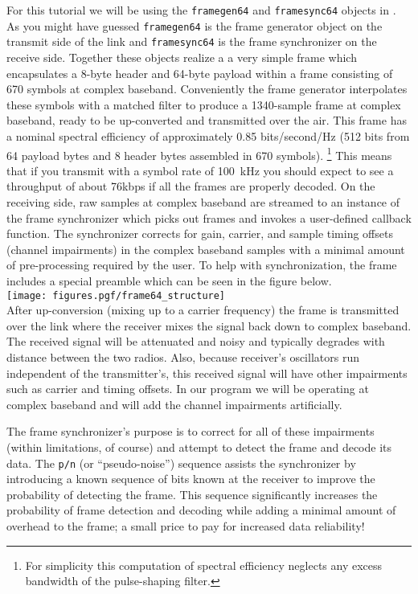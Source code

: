 For this tutorial we will be using the {\tt framegen64} and
{\tt framesync64} objects in \liquid.
As you might have guessed {\tt framegen64} is the frame generator object
on the transmit side of the link
and {\tt framesync64} is the frame synchronizer on the receive side.
%
Together these objects realize a
a very simple frame which encapsulates a 8-byte header and 64-byte
payload within a frame consisting of 670 symbols at complex baseband.
Conveniently the frame generator interpolates these symbols with a
matched filter to produce a 1340-sample frame at complex baseband,
ready to be up-converted and transmitted over the air.
This frame has a nominal spectral efficiency of approximately
0.85 bits/second/Hz
(512 bits from 64 payload bytes and 8 header bytes
assembled in 670 symbols).%
\footnote{
    For simplicity this computation of spectral efficiency
    neglects any excess bandwidth of the pulse-shaping filter.}
This means that if you transmit with a symbol rate of 100~kHz you should
expect to see a throughput of about 76kbps if all the frames are
properly decoded.
On the receiving side,
raw samples at complex baseband are streamed to an instance of
the frame synchronizer which picks out frames and invokes a user-defined
callback function.
The synchronizer corrects for gain, carrier, and sample timing offsets
(channel impairments) in the complex baseband samples with a minimal
amount of pre-processing required by the user.
%
To help with synchronization, the frame includes a special preamble
which can be seen in the figure below.\\
%
\texttt{[image: figures.pgf/frame64\_structure]}\\
%
After up-conversion (mixing up to a carrier frequency) the frame is
transmitted over the link where the receiver mixes the signal back down to
complex baseband.
The received signal will be attenuated and noisy and typically degrades
with distance between the two radios.
Also, because receiver's oscillators run independent of the
transmitter's,
this received signal will have other impairments such as carrier
and timing offsets.
In our program we will be operating at complex baseband and will add the
channel impairments artificially.

The frame synchronizer's purpose is to correct for all of these
impairments (within limitations, of course) and attempt to detect the
frame and decode its data.
The {\tt p/n} (or ``pseudo-noise'') sequence assists the synchronizer
by introducing a known sequence of bits known at the receiver to
improve the probability of detecting the frame.
This sequence significantly increases the probability of frame detection
and decoding while adding a minimal amount of overhead to the frame;
a small price to pay for increased data reliability!


